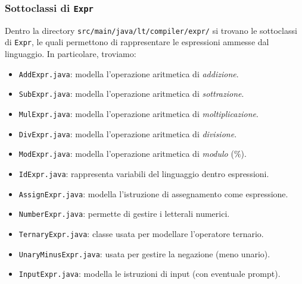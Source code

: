 \documentclass[hidelinks,10pt,a4paper]{article}
\begin{document}
\subsubsection{Sottoclassi di \texttt{Expr}}
Dentro la directory \texttt{src/main/java/lt/compiler/expr/} si trovano le sottoclassi di \texttt{Expr}, le quali permettono di rappresentare le espressioni ammesse dal linguaggio.
In particolare, troviamo:
\begin{itemize}
	\itemsep0em
    \item \texttt{AddExpr.java}: modella l'operazione aritmetica di \textit{addizione}.
    \item \texttt{SubExpr.java}: modella l'operazione aritmetica di \textit{sottrazione}.
    \item \texttt{MulExpr.java}: modella l'operazione aritmetica di \textit{moltiplicazione}.
    \item \texttt{DivExpr.java}: modella l'operazione aritmetica di \textit{divisione}.
    \item \texttt{ModExpr.java}: modella l'operazione aritmetica di \textit{modulo} ($\%$).
    \item \texttt{IdExpr.java}: rappresenta variabili del linguaggio dentro espressioni.
    \item \texttt{AssignExpr.java}: modella l'istruzione di assegnamento come espressione. 
    \item \texttt{NumberExpr.java}: permette di gestire i letterali numerici.
    \item \texttt{TernaryExpr.java}: classe usata per modellare l'operatore ternario.
    \item \texttt{UnaryMinusExpr.java}: usata per gestire la negazione (meno unario). 
    \item \texttt{InputExpr.java}: modella le istruzioni di input (con eventuale prompt).
\end{itemize}
\end{document}
